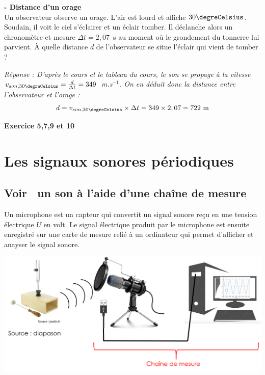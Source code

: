 \begin{mdframed}[style=autreexo]
\textbf{ - Distance d'un orage}\\
Un observateur observe un orage. L'air est lourd et affiche $30\degreCelsius$. Soudain, il voit le ciel s'éclairer et un éclair tomber. Il déclanche alors un chronomètre et mesure $\Delta t = 2,07$~s au moment où le grondement du tonnerre lui parvient. \`{A} quelle distance $d$ de l'observateur se situe l'éclair qui vient de tomber ?
\end{mdframed}
\textit{Réponse : D'après le cours et le tableau du cours, le son se propage à la vitesse $v_{son,30\degreCelsius}=\frac{d}{\Delta t}=349$~m.s$^{-1}$. On en déduit donc la distance entre l'observateur et l'orage :
\begin{equation*}
    d = v_{son,30\degreCelsius}\times \Delta t = 349\times 2,07 = 722~\text{m}
\end{equation*}}
\begin{Large}
\end{Large}\textbf{Exercice 5,7,9 et 10}

\section{Les signaux sonores périodiques}
\subsection{\og Voir \fg ~un son à l'aide d'une chaîne de mesure}
\begin{tcolorbox}[colback=green!5!white,colframe=green!75!black,title=\textbf{Microphone et enregistrement:}]
Un microphone est un capteur qui convertit un signal sonore reçu en une tension électrique $U$ en volt. Le signal électrique produit par le microphone est ensuite enregistré sur une carte de mesure relié à un ordinateur qui permet d'afficher et anayser le signal sonore.
\begin{center}
    \includegraphics[scale = 0.5]{Images/Chaine_mesure.png}
\end{center}
\end{tcolorbox}
